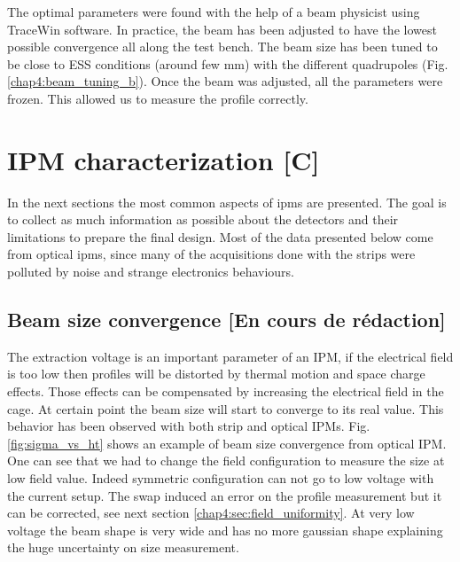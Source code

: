 \begin{refsection}
  The optimal parameters were found with the help of a beam physicist using TraceWin software. In practice, the beam has been adjusted to have the lowest possible convergence all along the test bench. The beam size has been tuned to be close to ESS conditions (around few $\mathrm{mm}$) with the different quadrupoles (Fig. \ref{chap4:beam_tuning_b}). Once the beam was adjusted, all the parameters were frozen. This allowed us to measure the profile correctly.

  


  \section{IPM characterization [C]}
  In the next sections the most common aspects of \acrshort{ipm}s are presented. The goal is to collect as much information as possible about the detectors and their limitations to prepare the final design. Most of the data presented below come from optical \acrshort{ipm}s, since many of the acquisitions done with the strips were polluted by noise and strange electronics behaviours.

  \subsection{Beam size convergence [En cours de rédaction]}

  The extraction voltage is an important parameter of an IPM, if the electrical field is too low then profiles will be distorted by thermal motion and space charge effects. Those effects can be compensated by increasing the electrical field in the cage. At certain point the beam size will start to converge to its real value. This behavior has been observed with both strip and optical IPMs. Fig. \ref{fig:sigma_vs_ht} shows an example of beam size convergence from optical IPM. One can see that we had to change the field configuration to measure the size at low field value. Indeed symmetric configuration can not go to low voltage with the current setup. The swap induced an error on the profile measurement but it can be corrected, see next section \ref{chap4:sec:field_uniformity}. At very low voltage the beam shape is very wide and has no more gaussian shape explaining the huge uncertainty on size measurement.
  
  


\end{refsection}
